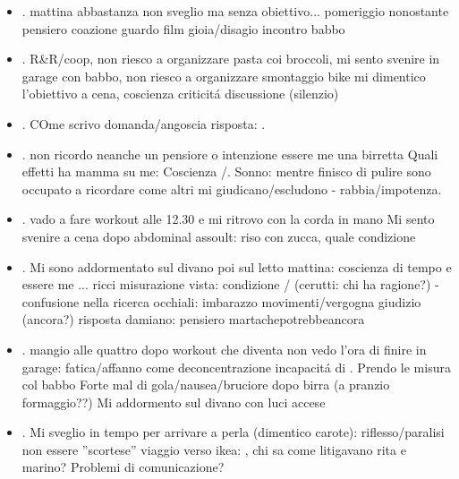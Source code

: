 \begin{itemize}
\item {}.
mattina abbastanza non sveglio ma senza obiettivo...
pomeriggio nonostante pensiero coazione guardo film
gioia/disagio incontro babbo
\item {}.
R\&R/coop, non riesco a organizzare pasta coi broccoli, mi sento svenire in garage con babbo, non riesco a organizzare smontaggio bike
mi dimentico l'obiettivo a cena, coscienza criticit\'a discussione (silenzio)
\item {}.
COme scrivo domanda/angoscia risposta: .
\item {}.
non ricordo neanche un pensiore o intenzione essere me
una birretta
Quali effetti ha mamma su me:
Coscienza /.
Sonno: mentre finisco di pulire sono occupato a ricordare come altri mi giudicano/escludono - rabbia/impotenza.
\item {}.
vado a fare workout alle 12.30 e mi ritrovo con la corda in mano
Mi sento svenire a cena dopo abdominal assoult: riso con zucca, quale condizione
\item {}.
Mi sono addormentato sul divano poi sul letto mattina: coscienza di tempo e essere me ... 
ricci misurazione vista: condizione / (cerutti: chi ha ragione?) - confusione nella ricerca occhiali: imbarazzo movimenti/vergogna giudizio (ancora?)
risposta damiano: pensiero martachepotrebbeancora
\item {}.
mangio alle quattro dopo workout che diventa non vedo l'ora di finire in garage: fatica/affanno come deconcentrazione incapacit\'a di .
Prendo le misura col babbo
Forte mal di gola/nausea/bruciore dopo birra (a pranzio formaggio??)
Mi addormento sul divano con luci accese
\item {}.
Mi sveglio in tempo per arrivare a perla (dimentico carote): riflesso/paralisi non essere ''scortese'' 
viaggio verso ikea: , chi sa come litigavano rita e marino? Problemi di comunicazione?

\end{itemize}
